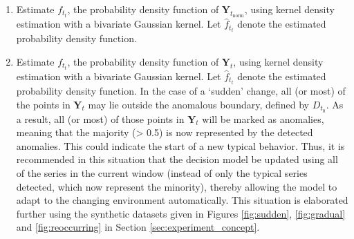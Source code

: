\documentclass[12pt]{article}
\providecommand{\tightlist}{%
  \setlength{\itemsep}{0pt}\setlength{\parskip}{0pt}}
\begin{document}
\begin{enumerate}
\def\labelenumi{\alph{enumi}.}
\tightlist
\item
  Estimate \(f_{t_{t}}\), the probability density function of
  \(\bm{Y}_{t_{\text{norm}}}\), using kernel density estimation with a
  bivariate Gaussian kernel. Let \(\hat{f}_{t_{t}}\) denote the
  estimated probability density function.
\item
  Estimate \(f_{t_{t}}\), the probability density function of
  \(\bm{Y}_{t}\), using kernel density estimation with a bivariate
  Gaussian kernel. Let \(\hat{f}_{t_{t}}\) denote the estimated
  probability density function. In the case of a `sudden' change, all
  (or most) of the points in \(\bm{Y}_{t}\) may lie outside the
  anomalous boundary, defined by \(D_{t_{0}}\). As a result, all (or
  most) of those points in \(\bm{Y}_{t}\) will be marked as anomalies,
  meaning that the majority (\textgreater{} 0.5) is now represented by
  the detected anomalies. This could indicate the start of a new typical
  behavior. Thus, it is recommended in this situation that the decision
  model be updated using all of the series in the current window
  (instead of only the typical series detected, which now represent the
  minority), thereby allowing the model to adapt to the changing
  environment automatically. This situation is elaborated further using
  the synthetic datasets given in Figures \ref{fig:sudden},
  \ref{fig:gradual} and \ref{fig:reoccurring} in Section
  \ref{sec:experiment_concept}.
\end{enumerate}

\vspace{-1em}
\end{document}
